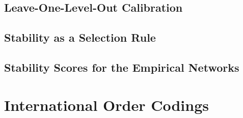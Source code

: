 \documentclass[11pt, letterpaper]{article}
\numberwithin{equation}{section}
\begin{document}
\subsection{Leave-One-Level-Out Calibration}
\begin{table}[ht]\centering
\caption{Validation share of fits above the calibrated floor when each network size or density level is held out of calibration.}
\label{tab:app_stability_lolo}
\end{table}

\subsection{Stability as a Selection Rule}
\begin{table}[ht]\centering
\caption{Share of simulated series in which the method with the higher stability score also has the higher joint NMI, by regime.}
\label{tab:app_selection_rule}
\end{table}

\subsection{Stability Scores for the Empirical Networks}
\begin{table}[ht]\centering
\caption{Bootstrap stability score, calibrated accuracy floor, and share of decided node pairs for each empirical network and method.}
\label{tab:app_empirical_stability}
\end{table}

\section{International Order Codings}
\label{app:orders}
\end{document}
